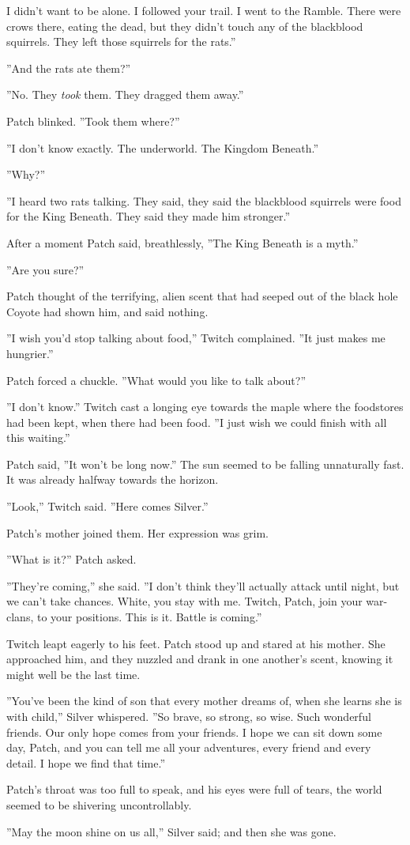 \documentclass[12pt]{book}
\begin{document}
 I didn't want to be alone. I followed your trail. I went to the Ramble. There were crows there, eating the dead, but they didn't touch any of the blackblood squirrels. They left those squirrels for the rats.''\par
 ''And the rats ate them?''\par
 ''No. They {\it took} them. They dragged them away.''\par
 Patch blinked. ''Took them where?''\par
 ''I don't know exactly. The underworld. The Kingdom Beneath.''\par
 ''Why?''\par
 ''I heard two rats talking. They said, they said the blackblood squirrels were food for the King Beneath. They said they made him stronger.''\par
 After a moment Patch said, breathlessly, ''The King Beneath is a myth.''\par
 ''Are you sure?''\par
 Patch thought of the terrifying, alien scent that had seeped out of the black hole Coyote had shown him, and said nothing.\par
 ''I wish you'd stop talking about food,'' Twitch complained. ''It just makes me hungrier.''\par
 Patch forced a chuckle. ''What would you like to talk about?''\par
 ''I don't know.'' Twitch cast a longing eye towards the maple where the foodstores had been kept, when there had been food. ''I just wish we could finish with all this waiting.''\par
 Patch said, ''It won't be long now.'' The sun seemed to be falling unnaturally fast. It was already halfway towards the horizon.\par
 ''Look,'' Twitch said. ''Here comes Silver.''\par
 Patch's mother joined them. Her expression was grim.\par
 ''What is it?'' Patch asked.\par
 ''They're coming,'' she said. ''I don't think they'll actually attack until night, but we can't take chances. White, you stay with me. Twitch, Patch, join your war-clans, to your positions. This is it. Battle is coming.''\par
 Twitch leapt eagerly to his feet. Patch stood up and stared at his mother. She approached him, and they nuzzled and drank in one another's scent, knowing it might well be the last time.\par
 ''You've been the kind of son that every mother dreams of, when she learns she is with child,'' Silver whispered. ''So brave, so strong, so wise. Such wonderful friends. Our only hope comes from your friends. I hope we can sit down some day, Patch, and you can tell me all your adventures, every friend and every detail. I hope we find that time.''\par
 Patch's throat was too full to speak, and his eyes were full of tears, the world seemed to be shivering uncontrollably.\par
 ''May the moon shine on us all,'' Silver said; and then she was gone.\par
\end{document}
